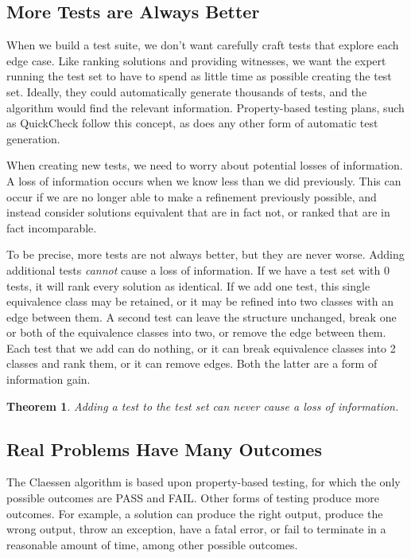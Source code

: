 \documentclass[11pt,twoside]{article}
\newtheorem{thm}{Theorem}
\theoremstyle{definition}
\let\cite=\citep
\begin{document}
\subsection{More Tests are Always Better}
When we build a test suite, we don't want carefully craft tests that explore each edge case. Like ranking solutions and providing witnesses, we want the expert running the test set to have to spend as little time as possible creating the test set. Ideally, they could automatically generate thousands of tests, and the algorithm would find the relevant information. Property-based testing plans, such as QuickCheck \cite{QuickCheck} follow this concept, as does any other form of automatic test generation.

When creating new tests, we need to worry about potential losses of information. A loss of information occurs when we know less than we did previously. This can occur if we are no longer able to make a refinement previously possible, and instead consider solutions equivalent that are in fact not, or ranked that are in fact incomparable.

To be precise, more tests are not always better, but they are never worse. Adding additional tests \emph{cannot} cause a loss of information. If we have a test set with 0 tests, it will rank every solution as identical. If we add one test, this single equivalence class may be retained, or it may be refined into two classes with an edge between them. A second test can leave the structure unchanged, break one or both of the equivalence classes into two, or remove the edge between them. Each test that we add can do nothing, or it can break equivalence classes into 2 classes and rank them, or it can remove edges. Both the latter are a form of information gain.


\begin{thm} Adding a test to the test set can never cause a loss of information.
\end{thm}

\subsection{Real Problems Have Many Outcomes}
The Claessen algorithm is based upon property-based testing, for which the only possible outcomes are PASS and FAIL. Other forms of testing produce more outcomes. For example, a solution can produce the right output, produce the wrong output, throw an exception, have a fatal error, or fail to terminate in a reasonable amount of time, among other possible outcomes.
\end{document}
